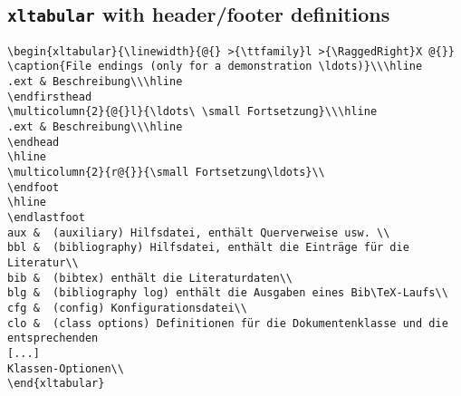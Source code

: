 \documentclass[paper=a4,fontsize=11pt,DIV=13,parskip=half-,
               captions=tableabove,twoside=on]{scrartcl}
\begin{document}
\subsection{\texttt{xltabular} with header/footer definitions}

\begin{Verbatim}[frame=lines]
\begin{xltabular}{\linewidth}{@{} >{\ttfamily}l >{\RaggedRight}X @{}}
\caption{File endings (only for a demonstration \ldots)}\\\hline
.ext & Beschreibung\\\hline
\endfirsthead
\multicolumn{2}{@{}l}{\ldots\ \small Fortsetzung}\\\hline
.ext & Beschreibung\\\hline
\endhead
\hline
\multicolumn{2}{r@{}}{\small Fortsetzung\ldots}\\
\endfoot
\hline
\endlastfoot
aux &  (auxiliary) Hilfsdatei, enthält Querverweise usw. \\ 
bbl &  (bibliography) Hilfsdatei, enthält die Einträge für die Literatur\\ 
bib &  (bibtex) enthält die Literaturdaten\\ 
blg &  (bibliography log) enthält die Ausgaben eines Bib\TeX-Laufs\\ 
cfg &  (config) Konfigurationsdatei\\ 
clo &  (class options) Definitionen für die Dokumentenklasse und die entsprechenden
[...]
Klassen-Optionen\\ 
\end{xltabular}
\end{Verbatim}
\end{document}
